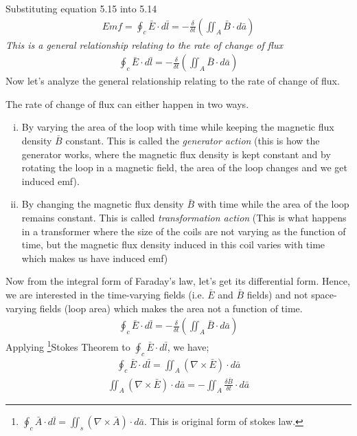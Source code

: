 Substituting equation 5.15 into 5.14 
\begin{align*}
\boxed{Emf = \oint_c\bar{E}\cdot d\bar{l} = -\frac{\delta}{\delta t} (\iint_A\bar{B}\cdot d\bar{a})}
\end{align*}
\emph{This is a general relationship relating to the rate of change of flux}	
\begin{align}
\boxed{\oint_c\bar{E}\cdot d\bar{l} = -\frac{\delta}{\delta t} (\iint_A\bar{B}\cdot d\bar{a})}
\end{align} 
Now let's analyze the general relationship relating to the rate of change of flux.

The rate of change of flux can either happen in two ways.
\begin{enumerate}[(i)]
\item By varying the area of the loop with time while keeping the magnetic flux density $\bar{B}$ constant. This is called the \emph{generator action} (this is how the generator works, where the magnetic flux density is kept constant and by rotating the loop in a magnetic field, the area of the loop changes and we get induced emf).
\item By changing the magnetic flux density $\bar{B}$ with time while the area of the loop remains constant. This is called \emph{transformation action} (This is what happens in a transformer where the size of the coils are not varying as the function of time, but the magnetic flux density induced in this coil varies with time which makes us have induced emf)
\end{enumerate}
Now from the integral form of Faraday's law, let's get its differential form. Hence, we are interested in the time-varying fields (i.e. $\bar{E}$ and $\bar{B}$ fields) and not space-varying fields (loop area) which makes the area not a function of time.
\begin{align*}
{\oint_c\bar{E}\cdot d\bar{l} = -\frac{\delta}{\delta t}(\iint_A\bar{B}\cdot d\bar{a})}
\end{align*}	
Applying \footnote[10]{$\oint_c\bar{A}\cdot d\bar{l} = \iint_s(\nabla \times \bar{A})\cdot d\bar{a}$. This is original form of stokes law.}Stokes Theorem to $\oint_c\bar{E}\cdot d\bar{l}$, we have;
\begin{align*}
\oint_c\bar{E}\cdot d\bar{l} = \iint_A(\nabla\times\bar{E})\cdot d\bar{a}
\end{align*}
\begin{align*}
\iint_A(\nabla\times\bar{E})\cdot d\bar{a} = -\iint_A\frac{\delta \bar{B}}{\delta t}\cdot d\bar{a}
\end{align*}
